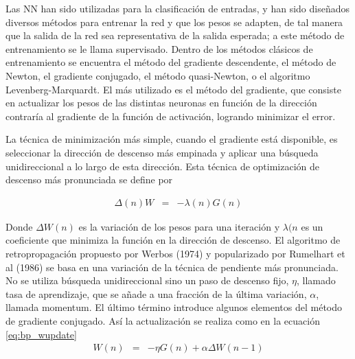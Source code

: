 Las NN han sido utilizadas para la clasificación de entradas, y han sido diseñados diversos métodos para entrenar la red y que los pesos se adapten, de tal manera que la salida de la red sea representativa de la salida esperada; a este método de entrenamiento se le llama supervisado. Dentro de los métodos clásicos de entrenamiento se encuentra el método del gradiente descendente, el método de Newton, el gradiente conjugado, el método quasi-Newton, o el algoritmo Levenberg-Marquardt. El más utilizado es el método del gradiente, que consiste en actualizar los pesos de las distintas neuronas en función de la dirección contraría al gradiente de la función de activación, logrando minimizar el error.

La técnica de minimización más simple, cuando el gradiente está disponible, es seleccionar la dirección de descenso más empinada y aplicar una búsqueda unidireccional a lo largo de esta dirección. Esta técnica de optimización de descenso más pronunciada se define por

\begin{eqnarray}
	\Delta(n) W &=& -\lambda(n)G(n)
\end{eqnarray}

Donde $\Delta W(n)$ es la variación de los pesos para una iteración y $\lambda(n$ es un coeficiente que minimiza la función en la dirección de descenso. %
El algoritmo de retropropagación propuesto por Werbos (1974) y popularizado por Rumelhart et al (1986) se basa en una variación de la técnica de pendiente más pronunciada. No se utiliza búsqueda unidireccional sino un paso de descenso fijo, $\eta$, llamado tasa de aprendizaje, que se añade a una fracción de la última variación, $\alpha$, llamada momentum. El último término introduce algunos elementos del método de gradiente conjugado. %
%
Así la actualización se realiza como en la ecuación \ref{eq:bp_wupdate}
\begin{eqnarray}
	W(n) &=& -\eta G(n) + \alpha\Delta W(n - 1)\label{eq:bp_wupdate}
\end{eqnarray}

